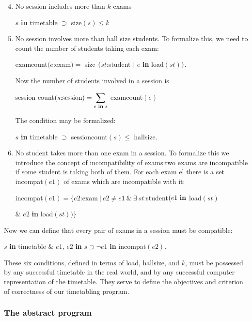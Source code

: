 \begin{enumerate}[leftmargin=2\parindent, label=(\arabic*)]
	\setcounter{enumi}{3}
	
	\item \label{en:examination-4}
	No session includes more than $k$ exams

	\quad $s$ \textbf{in} timetable $\supset$ size$(s) \leqslant k$

	\item \label{en:examination-5}
	No session involves more than hall size students. To formalize this, we need to count the number of students taking each exam:
	
	\quad examcount$(e$:$\text{exam}) = $ size $\{st$:student $\mid$ $e$ \textbf{in} load$(st)\}$.
	
	Now the number of students involved in a session is
	
	\quad session count$(s\text{:session}) = \displaystyle\sum_{e \text{ \textbf{in} } s}$ examcount$(e)$
	
	The condition may be formalized:
	
	\quad $s$ \textbf{in} timetable $\supset$ sessioncount$(s) \leqslant$ hallsize.
	
	\item \label{en:examination-6}
	No student takes more than one exam in a session. To formalize this we introduce the concept of incompatibility of exams:two exams are incompatible if some student is taking both of them. For each exam el there is a set incompat$(e1)$ of exams which are incompatible with it:
	
	\quad incompat$(e1)= \{e2\text{:exam}\ |\ e2 \neq e1\ \&\ \exists\ st$:student$(e1 \text{ \textbf{in}}$ load$(st)$
		
	\tabto*{8.2em} \& $e2$ \textbf{in} load$(st))\}$
\end{enumerate}

\noindent
Now we can define that every pair of exams in a session must be compatible:

\quad $s$ \textbf{in} timetable \& $e1$, $e2$ \textbf{in} $s \supset\neg e1$ \textbf{in} incompat$(e2)$.

These six conditions, defined in terms of load, hallsize, and $k$, must be possessed by any successful timetable in the real world, and by any successful computer representation of the timetable. They serve to define the objectives and criterion of correctness of our timetabling program.

\subsubsection{The abstract program}


